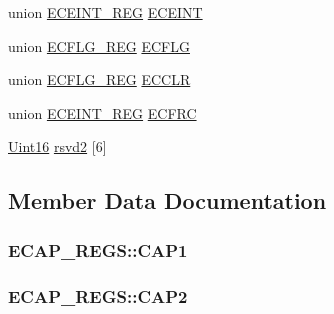 \begin{DoxyCompactItemize}
\item 
union \hyperlink{union_e_c_e_i_n_t___r_e_g}{E\+C\+E\+I\+N\+T\+\_\+\+R\+E\+G} \hyperlink{struct_e_c_a_p___r_e_g_s_a4e0a782f9f422e3032dec725f7c7ef69}{E\+C\+E\+I\+N\+T}
\item 
union \hyperlink{union_e_c_f_l_g___r_e_g}{E\+C\+F\+L\+G\+\_\+\+R\+E\+G} \hyperlink{struct_e_c_a_p___r_e_g_s_a7ded1715c5d811cee06c18ef4536d5c2}{E\+C\+F\+L\+G}
\item 
union \hyperlink{union_e_c_f_l_g___r_e_g}{E\+C\+F\+L\+G\+\_\+\+R\+E\+G} \hyperlink{struct_e_c_a_p___r_e_g_s_adac3d7edbb10e57159958c36d3eb43b3}{E\+C\+C\+L\+R}
\item 
union \hyperlink{union_e_c_e_i_n_t___r_e_g}{E\+C\+E\+I\+N\+T\+\_\+\+R\+E\+G} \hyperlink{struct_e_c_a_p___r_e_g_s_aac4672948d6b2a31af2bab995cad912d}{E\+C\+F\+R\+C}
\item 
\hyperlink{_d_s_p2833x___device_8h_a59a9f6be4562c327cbfb4f7e8e18f08b}{Uint16} \hyperlink{struct_e_c_a_p___r_e_g_s_a7f2037bf2181e25aa04fa346139e7ae9}{rsvd2} \mbox{[}6\mbox{]}
\end{DoxyCompactItemize}


\subsection{Member Data Documentation}
\hypertarget{struct_e_c_a_p___r_e_g_s_a5a05dbca568a792018da16891acae3c8}{}
\subsubsection[{C\+A\+P1}]{ E\+C\+A\+P\+\_\+\+R\+E\+G\+S\+::\+C\+A\+P1}\label{struct_e_c_a_p___r_e_g_s_a5a05dbca568a792018da16891acae3c8}
\hypertarget{struct_e_c_a_p___r_e_g_s_a3bebb090261767e32bbfa4a166d1f9bc}{}
\subsubsection[{C\+A\+P2}]{ E\+C\+A\+P\+\_\+\+R\+E\+G\+S\+::\+C\+A\+P2}\label{struct_e_c_a_p___r_e_g_s_a3bebb090261767e32bbfa4a166d1f9bc}
\hypertarget{struct_e_c_a_p___r_e_g_s_a4c9775132229605a80476b5c02fce840}{}
